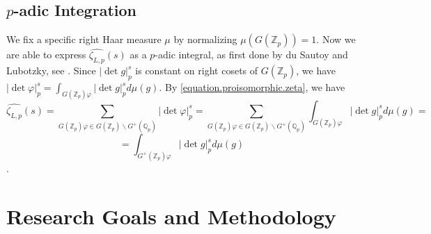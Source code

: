 \documentclass[12pt]{article}
\begin{document}
\subsection{$p$-adic Integration}
We fix a specific right Haar measure $\mu$ by normalizing $\mu(G(\mathbb{Z}_p))=1$. Now we are able to express $\hat{\zeta_{L,p}}(s)$ as a $p$-adic integral, as first done by du Sautoy and Lubotzky, see \cite{DuSautoyLubotzky}. Since $|\det{g}|_{p}^{s}$ is constant on right cosets of $G(\mathbb{Z}_{p})$, we have $|\det\varphi|_{p}^{s}=\displaystyle\int_{G(\mathbb{Z}_p)\varphi}{|\det{g}|_{p}^{s}}d\mu(g)$. By \eqref{equation.proisomorphic.zeta}, we have \[\hat{\zeta_{L,p}}(s)=\underset{\scriptscriptstyle G(\mathbb{Z}_p)\varphi\in G(\mathbb{Z}_p)\backslash{G^+(\mathbb{Q}_p)}}{\sum}|\det\varphi|_{p}^{s}=\underset{\scriptscriptstyle{G(\mathbb{Z}_p)}\varphi\in G(\mathbb{Z}_p)\backslash{G^+(\mathbb{Q}_p)}}{\sum}\displaystyle{\int_{G(\mathbb{Z}_p)\varphi}}{|\det{g}|_{p}^{s}}d\mu(g)=\]\[=\displaystyle\int_{G^{+}(\mathbb{Z}_p)\varphi}{|\det{g}|_{p}^{s}}d\mu(g)\].
\section{Research Goals and Methodology}
\end{document}
